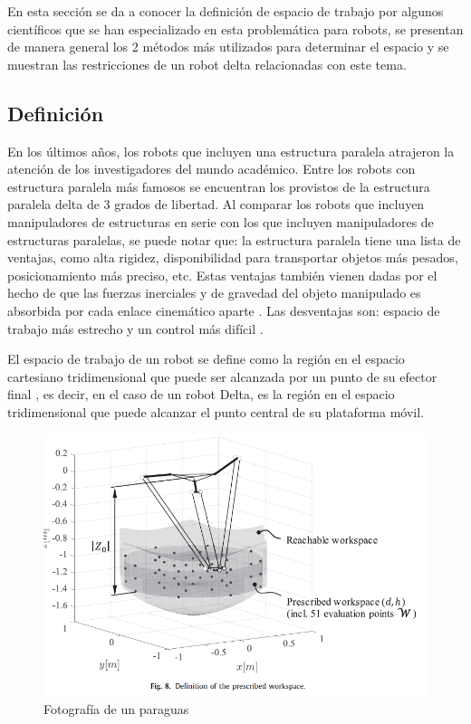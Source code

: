 En esta sección se da a conocer la definición de espacio de trabajo por algunos científicos que se han especializado en esta problemática para robots, se presentan de manera general los 2 métodos más utilizados para determinar el espacio y se muestran las restricciones de un robot delta relacionadas con este tema.

    \subsection{Definición}
    En los últimos años, los robots que incluyen una estructura paralela atrajeron la atención de los investigadores del mundo académico. Entre los robots con estructura paralela más famosos se encuentran los provistos de la estructura paralela delta de 3 grados de libertad.  Al comparar los robots que incluyen manipuladores de estructuras en serie con los que incluyen manipuladores de estructuras paralelas, se puede notar que: la estructura paralela tiene una lista de ventajas, como alta rigidez, disponibilidad para transportar objetos más pesados, posicionamiento más preciso, etc. Estas ventajas también vienen dadas por el hecho de que las fuerzas inerciales y de gravedad del objeto manipulado es absorbida por cada enlace cinemático aparte \cite{Laribi08}\cite{DASH2005776}. Las desventajas son: espacio de trabajo más estrecho y un control más difícil \cite{DASH2005776}.  
    
    El espacio de trabajo de un robot se define como la región en el espacio cartesiano tridimensional que puede ser alcanzada por un punto de su efector final \cite{LARIBI2007859}, es decir, en el caso de un robot Delta, es la región en el espacio tridimensional que puede alcanzar el punto central de su plataforma móvil. 
    
    \begin{figure}[htb]
        \centering
        \includegraphics[width=0.7\linewidth]{Main/Chapter4/Images4/cap4_ws_1.png}
        \caption{Fotografía de un paraguas}
        \label{f:Cap4_ws_1}
    \end{figure}  
    
